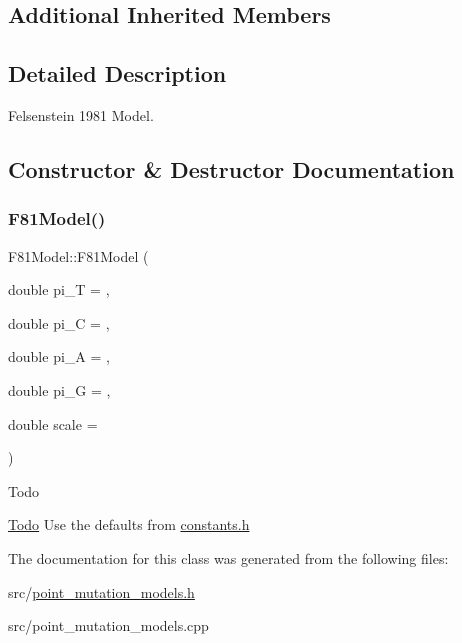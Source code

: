 \subsection*{Additional Inherited Members}


\subsection{Detailed Description}
Felsenstein 1981 Model. 

\subsection{Constructor \& Destructor Documentation}
\mbox{\label{classrcombinator_1_1F81Model_a6efce55b280e00a48471632574fe7944}} 
\subsubsection{\texorpdfstring{F81\+Model()}{F81Model()}}
{\footnotesize\ttfamily F81\+Model\+::\+F81\+Model (\begin{DoxyParamCaption}\item[{double}]{pi\+\_\+T = {},  }\item[{double}]{pi\+\_\+C = {},  }\item[{double}]{pi\+\_\+A = {},  }\item[{double}]{pi\+\_\+G = {},  }\item[{double}]{scale = {} }\end{DoxyParamCaption})}

\begin{DoxyRefDesc}{Todo}
\item[\mbox{\hyperlink{todo__todo000005}{Todo}}]Use the defaults from \mbox{\hyperlink{constants_8h}{constants.\+h}} \end{DoxyRefDesc}


The documentation for this class was generated from the following files\+:\begin{DoxyCompactItemize}
\item 
src/\mbox{\hyperlink{point__mutation__models_8h}{point\+\_\+mutation\+\_\+models.\+h}}\item 
src/point\+\_\+mutation\+\_\+models.\+cpp\end{DoxyCompactItemize}
